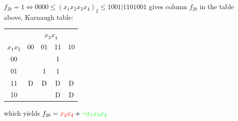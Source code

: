\documentclass[10pt,a4paper]{scrartcl}
\newcommand{\subExercise}[1]{\vspace{0.5em} \noindent{\bf #1)}}
\begin{document}
                 
                 
\subExercise{b}


$f_{2b} = 1 \Leftrightarrow 0000\leq(x_1x_2x_3x_4)_2\leq1001 | 1101001 $ gives column $f_{2b}$ in the table above, Karnaugh table:\\
\begin{tabular}{|c||c|c|c|c|}
  \hline 
            & \multicolumn{4}{c|}{$x_3x_4$} \\
$x_1x_2$ & 00                  & 01                  & 11                 & 10                \\ \hline
    00   &                     &                     & \cellcolor{green}1 &                   \\ \hline
    01   &                     & \cellcolor{red}1    & \cellcolor{yellow}1&                   \\ \hline
    11   & D                   & \cellcolor{red}D    & \cellcolor{red}D   & D                 \\ \hline
    10   &                     &                     & D                  & D                 \\
  \hline
\end{tabular}
which yields $f_{2b} = \textcolor{red}{x_2x_4}+\textcolor{green}{\neg x_1x_3x_4}$
\end{document}
